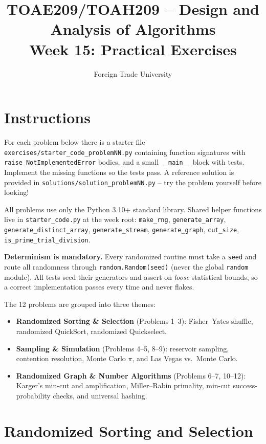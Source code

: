 \documentclass[11pt]{article}
\title{TOAE209/TOAH209 -- Design and Analysis of Algorithms\\[4pt]
\large Week 15: Practical Exercises}
\author{Foreign Trade University}
\date{}
\begin{document}
\maketitle

\section*{Instructions}

For each problem below there is a starter file
\texttt{exercises/starter\_code\_problemNN.py} containing function signatures with
\texttt{raise NotImplementedError} bodies, and a small \texttt{\_\_main\_\_} block with
tests. Implement the missing functions so the tests pass. A reference solution is
provided in \texttt{solutions/solution\_problemNN.py} -- try the problem yourself before
looking!

All problems use only the Python 3.10+ standard library. Shared helper functions live in
\texttt{starter\_code.py} at the week root: \texttt{make\_rng}, \texttt{generate\_array},
\texttt{generate\_distinct\_array}, \texttt{generate\_stream}, \texttt{generate\_graph},
\texttt{cut\_size}, \texttt{is\_prime\_trial\_division}.

\textbf{Determinism is mandatory.} Every randomized routine must take a \texttt{seed} and
route all randomness through \texttt{random.Random(seed)} (never the global \texttt{random}
module). All tests seed their generators and assert on \emph{loose} statistical bounds, so
a correct implementation passes every time and never flakes.

The 12 problems are grouped into three themes:
\begin{itemize}
    \item \textbf{Randomized Sorting \& Selection} (Problems 1--3): Fisher--Yates shuffle,
    randomized QuickSort, randomized Quickselect.
    \item \textbf{Sampling \& Simulation} (Problems 4--5, 8--9): reservoir sampling,
    contention resolution, Monte Carlo $\pi$, and Las Vegas vs.\ Monte Carlo.
    \item \textbf{Randomized Graph \& Number Algorithms} (Problems 6--7, 10--12): Karger's
    min-cut and amplification, Miller--Rabin primality, min-cut success-probability checks,
    and universal hashing.
\end{itemize}

\newpage
\section{Randomized Sorting and Selection}
\end{document}
